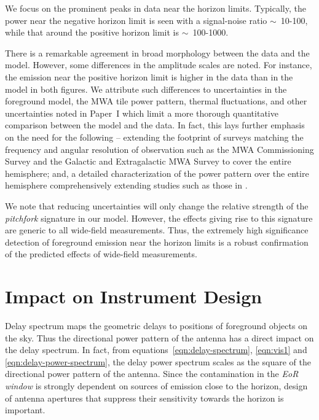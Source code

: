 \documentclass[preprint2,apjl,numberedappendix,twocolappendix,appendixfloats]{emulateapj}
\begin{document}
We focus on the prominent peaks in data near the horizon limits. Typically, the power near the negative horizon limit is seen with a signal-noise ratio $\sim$~10-100, while that around the positive horizon limit is $\sim$~100-1000. 

There is a remarkable agreement in broad morphology between the data and the model. However, some differences in the amplitude scales are noted. For instance, the emission near the positive horizon limit is higher in the data than in the model in both figures. We attribute such differences to uncertainties in the foreground model, the MWA tile power pattern, thermal fluctuations, and other uncertainties noted in Paper~I which limit a more thorough quantitative comparison between the model and the data. In fact, this lays further emphasis on the need for the following -- extending the footprint of surveys matching the frequency and angular resolution of observation such as the MWA Commissioning Survey \citep[MWACS;][]{hur14} and the Galactic and Extragalactic MWA Survey \citep[GLEAM;][]{way15} to cover the entire hemisphere; and, a detailed characterization of the power pattern over the entire hemisphere comprehensively extending studies such as those in \citet{neb15}.

We note that reducing uncertainties will only change the relative strength of the {\it pitchfork} signature in our model. However, the effects giving rise to this signature are generic to all wide-field measurements. Thus, the extremely high significance detection of foreground emission near the horizon limits is a robust confirmation of the predicted effects of wide-field measurements.

\section{Impact on Instrument Design}\label{sec:impact}

Delay spectrum maps the geometric delays to positions of foreground objects on the sky. Thus the directional power pattern of the antenna has a direct impact on the delay spectrum. In fact, from equations~\ref{eqn:delay-spectrum}, \ref{eqn:vis1} and \ref{eqn:delay-power-spectrum}, the delay power spectrum scales as the square of the directional power pattern of the antenna. Since the contamination in the {\it EoR window} is strongly dependent on sources of emission close to the horizon, design of antenna apertures that suppress their sensitivity towards the horizon is important. 
\end{document}
